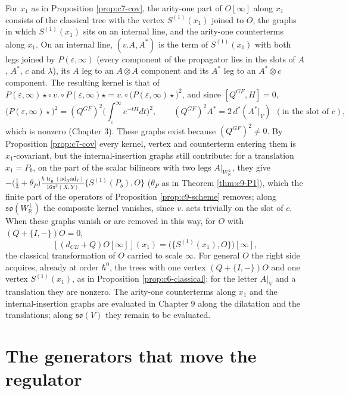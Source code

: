 \begin{remark}
\label{rem:c7-internal}
For $x_1$ as in Proposition \ref{prop:c7-cov}, the arity-one part of $O[\infty]$ along $x_1$ consists of the classical tree with the vertex $S^{(1)}(x_1)$ joined to $O$, the graphs in which $S^{(1)}(x_1)$ sits on an internal line, and the arity-one counterterms along $x_1$. On an internal line, $(v.A,A^*)$ is the term of $S^{(1)}(x_1)$ with both legs joined by $P(\varepsilon,\infty)$ (every component of the propagator lies in the slots of $A$, $A^*$, $c$ and $\lambda$), its $A$ leg to an $A\otimes A$ component and its $A^*$ leg to an $A^*\otimes c$ component. The resulting kernel is that of $P(\varepsilon,\infty)\star\circ\,v.\circ P(\varepsilon,\infty)\star=v.\circ\big(P(\varepsilon,\infty)\star\big)^2$, and since $[Q^{GF},H]=0$,
\[
\big(P(\varepsilon,\infty)\star\big)^2=(Q^{GF})^2\Big(\int_\varepsilon^\infty e^{-tH}dt\Big)^2,\qquad (Q^{GF})^2A^*=2\,d^*(A^*|_V)\ \ (\text{in the slot of }c),
\]
which is nonzero (Chapter 3). These graphs exist because $(Q^{GF})^2\neq0$. By Proposition \ref{prop:c7-cov} every kernel, vertex and counterterm entering them is $x_1$-covariant, but the internal-insertion graphs still contribute: for a translation $x_1=P_b$, on the part of the scalar bilinears with two legs $A|_{W_{\mathbb R}^\perp}$, they give $-\big(\tfrac13+\theta_P\big)\frac{\hbar\operatorname{tr}_{\mathfrak g}(\mathrm{ad}_X\mathrm{ad}_Y)}{16\pi^2(X,Y)}\{S^{(1)}(P_b),O\}$ ($\theta_P$ as in Theorem \ref{thm:c9-P1}), which the finite part of the operators of Proposition \ref{prop:c9-scheme} removes; along $\mathfrak{so}(W_{\mathbb R}^\perp)$ the composite kernel vanishes, since $v.$ acts trivially on the slot of $c$. When these graphs vanish or are removed in this way, for $O$ with $(Q+\{I,-\})O=0$,
\[
[(d_{CE}+Q)O[\infty]](x_1)=\big(\{S^{(1)}(x_1),O\}\big)[\infty],
\]
the classical transformation of $O$ carried to scale $\infty$. For general $O$ the right side acquires, already at order $\hbar^0$, the trees with one vertex $(Q+\{I,-\})O$ and one vertex $S^{(1)}(x_1)$, as in Proposition \ref{prop:c6-classical}; for the letter $A|_V$ and a translation they are nonzero. The arity-one counterterms along $x_1$ and the internal-insertion graphs are evaluated in Chapter 9 along the dilatation and the translations; along $\mathfrak{so}(V)$ they remain to be evaluated.
\end{remark}

\section{The generators that move the regulator}

